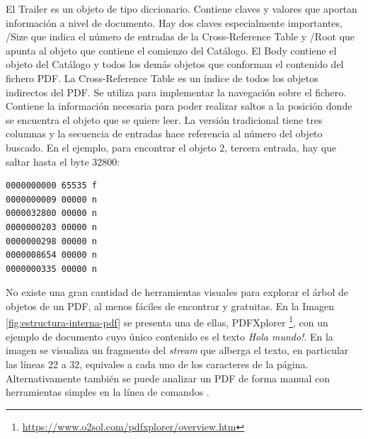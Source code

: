 El Trailer es un objeto de tipo diccionario. Contiene claves y valores que aportan información a nivel de documento. Hay dos claves especialmente importantes, /Size que indica el número de entradas de la Cross-Reference Table y /Root que apunta al objeto que contiene el comienzo del Catálogo. El Body contiene el objeto del Catálogo y todos los demás objetos que conforman el contenido del fichero PDF. La Cross-Reference Table es un índice de todos los objetos indirectos del PDF. Se utiliza para implementar la navegación sobre el fichero. Contiene la información necesaria para poder realizar saltos a la posición donde se encuentra el objeto que se quiere leer. La versión tradicional tiene tres columnas y la secuencia de entradas hace referencia al número del objeto buscado. En el ejemplo, para encontrar el objeto 2, tercera entrada, hay que saltar hasta el byte 32800:

\begin{lstlisting}[caption={Entradas en la Cross-Reference Table},label=lst:cross-ref-table]
0000000000 65535 f
0000000009 00000 n
0000032800 00000 n
0000000203 00000 n
0000000298 00000 n
0000008654 00000 n
0000000335 00000 n
\end{lstlisting}

No existe una gran cantidad de herramientas visuales para explorar el árbol de objetos de un PDF, al menos fáciles de encontrar y gratuitas. En la Imagen \ref{fig:estructura-interna-pdf} se presenta una de ellas, PDFXplorer \footnote{\url{https://www.o2sol.com/pdfxplorer/overview.htm}}, con un ejemplo de documento cuyo único contenido es el texto \emph{Hola mundo!}. En la imagen se visualiza un fragmento del \emph{stream} que alberga el texto, en particular las líneas 22 a 32, equivales a cada uno de los caracteres de la página. Alternativamente también se puede analizar un PDF de forma manual con herramientas simples en la línea de comandos \cite{filodej_blog_pdfstreamcontent}.

